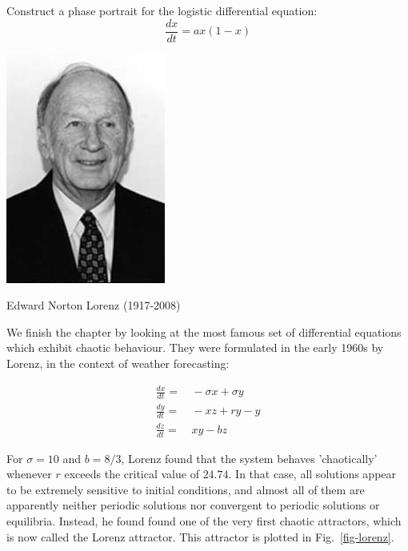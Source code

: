\begin{exer}
Construct a phase portrait for the logistic differential equation:
$$\frac{dx}{dt} = a x (1-x)$$
\end{exer}

\pagebreak

\label{week12}

\begin{marginfigure}[0.0cm]
  \includegraphics{dynamic/figures/e_lorenz}
  \caption{Edward Norton Lorenz (1917-2008)}
\end{marginfigure}

We finish the chapter by looking at the most famous set of differential equations which exhibit chaotic behaviour. They were formulated in the early 1960s by Lorenz, in the context of weather forecasting:

\begin{align}
\frac{dx}{dt} =& \, -\sigma x + \sigma y \\
\frac{dy}{dt} =& \, -xz + r y - y \\
\frac{dz}{dt} =& \, xy - bz
\end{align} 

For $\sigma=10$ and $b=8/3$, Lorenz found that the system behaves 'chaotically' whenever $r$ exceeds the critical value of $24.74$. In that case, all solutions appear to be extremely sensitive to initial conditions, and almost all of them are apparently neither periodic solutions nor convergent to periodic solutions or equilibria. Instead, he found found one of the very first chaotic attractors, which is now called the Lorenz attractor. This attractor is plotted in Fig.~\ref{fig-lorenz}.

